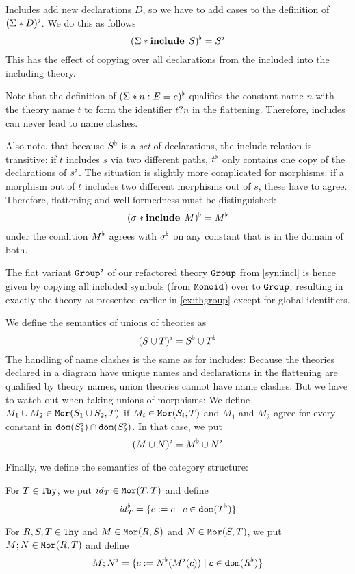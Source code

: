\begin{example}\label{sem:incl}
Includes add new declarations $D$, so we have to add cases to the definition of $(\Sigma\ast D)^\flat$.
We do this as follows
  \[(\Sigma\ast \operatorname{\mathbf{include}}{\;S})^\flat = S^\flat\]
This has the effect of copying over all declarations from the included into the including theory.

Note that the definition of $(\Sigma\ast n:E=e)^\flat$ qualifies the constant name $n$ with the theory name $t$ to form the identifier $t?n$ in the flattening.
Therefore, includes can never lead to name clashes.

Also note, that because $S^\flat$ is a \textit{set} of declarations, the include relation is transitive: if $t$ includes $s$ via two different paths, $t^\flat$ only contains one copy of the declarations of $s^\flat$.
The situation is slightly more complicated for morphisms: if a morphism out of $t$ includes two different morphisms out of $s$, these have to agree.
Therefore, flattening and well-formedness must be distinguished:
  \[(\sigma\ast \operatorname{\mathbf{include}}{\;M})^\flat = M^\flat\]
under the condition $M^\flat$ agrees with $\sigma^\flat$ on any constant that is in the domain of both.

The flat variant $\operatorname{\mathtt{Group}}^\flat$ of our refactored theory $\operatorname{\mathtt{Group}}$ from \autoref{syn:incl} is hence given by copying all included symbols (from $\operatorname{\mathtt{Monoid}}$) over to $\operatorname{\mathtt{Group}}$, resulting in exactly the theory as presented earlier in \autoref{ex:thgroup} except for global identifiers.
\end{example}

\begin{example}\label{sem:union}
We define the semantics of unions of theories as
\[(S\cup T)^\flat=S^\flat\cup T^\flat\]
The handling of name clashes is the same as for includes:
Because the theories declared in a diagram have unique names and declarations in the flattening are qualified by theory names, union theories cannot have name clashes.
But we have to watch out when taking unions of morphisms:
We define $M_1\cup M_2\in \mathtt{Mor}(S_1\cup S_2,T)$ if $M_i\in\mathtt{Mor}(S_i,T)$ and $M_1$ and $M_2$ agree for every constant in $\mathtt{dom}(S_1^\flat)\cap\mathtt{dom}(S_2^\flat)$.
In that case, we put
\[(M\cup N)^\flat=M^\flat\cup N^\flat\]
\end{example}

Finally, we define the semantics of the category structure:
\begin{example}\label{sem:cat}
For $T\in\mathtt{Thy}$, we put $\mathit{id}_{T}\in\mathtt{Mor}(T,T)$ and define
\[\mathit{id}_{T}^\flat=\{c:=c \;|\; c\in\mathtt{dom}(T^\flat)\}\]

For $R,S,T\in\mathtt{Thy}$ and $M\in\mathtt{Mor}(R,S)$ and $N\in\mathtt{Mor}(S,T)$, we put $M;N\in\mathtt{Mor}(R,T)$ and define
\[M;N^\flat=\{c:=N^\flat(M^\flat(c)) \;|\; c\in\mathtt{dom}(R^\flat)\}\]
\end{example}

